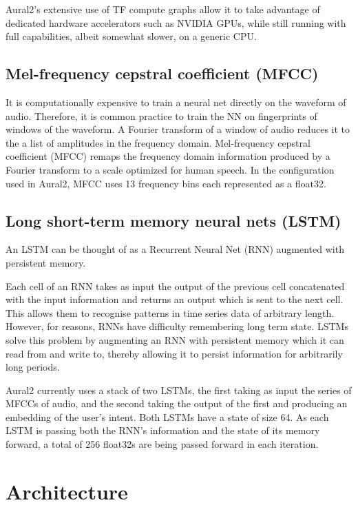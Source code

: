 \documentclass[conference]{IEEEtran}
\begin{document}
Aural2's extensive use of TF compute graphs allow it to take advantage
of dedicated hardware accelerators such as NVIDIA GPUs, while still
running with full capabilities, albeit somewhat slower, on a generic CPU.

\subsection{Mel-frequency cepstral coefficient (MFCC)}

It is computationally expensive to train a neural net directly on the waveform of audio\cite{b6}.
Therefore, it is common practice to train the NN on fingerprints of windows of the waveform\cite{b7}.
A Fourier transform of a window of audio reduces it to the a list of amplitudes in the frequency domain.
Mel-frequency cepstral coefficient (MFCC) remaps the frequency domain information produced by a Fourier transform to a scale optimized for human speech.
In the configuration used in Aural2, MFCC uses 13 frequency bins each represented as a float32.

\subsection{Long short-term memory neural nets (LSTM)}

An LSTM can be thought of as a Recurrent Neural Net (RNN) augmented with
persistent memory\cite{b8}.

Each cell of an RNN takes as input the output of the previous cell concatenated with the input information and returns an output which is sent to the next cell.
This allows them to recognise patterns in time series data of arbitrary length.
However, for reasons, RNNs have difficulty remembering long term state.
LSTMs solve this problem by augmenting an RNN with persistent memory which it can read from and write to, thereby allowing it to persist information for arbitrarily
long periods.

Aural2 currently uses a stack of two LSTMs, the first taking as input the series of MFCCs of audio, and the second taking the output of the first and producing an embedding of the user's intent.
Both LSTMs have a state of size 64. As each LSTM is passing both the RNN's information and the state of its memory forward, a total of 256 float32s are being passed forward in each iteration.

\section{Architecture}
\end{document}
